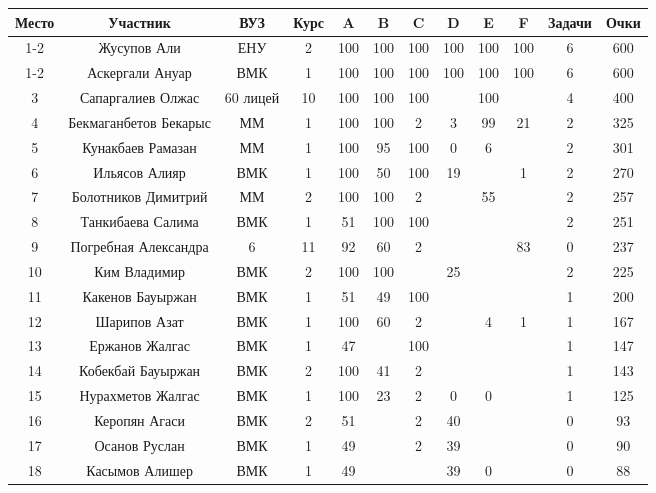 \begin{center}
\begin{longtable}{|c|c|c|c|*{6}{c|}c|c|}
\hline 
Место & 	Участник & 	ВУЗ & Курс & 	A & 	B & 	C & 	D & 	E & 	F & 	Задачи & 	Очки \\ 
 \hline
 \endhead
1-2 & 	Жусупов Али & 	ЕНУ & 2 &	100 & 	100 & 	100 & 	100 & 	100 & 	100 & 	6 & 	600 \\ 
 \hline
1-2 & 	Аскергали Ануар & 	ВМК & 1 & 	100 & 	100 & 	100 & 	100 & 	100 & 	100 & 	6 & 	600 \\ 
 \hline
3 & 	Сапаргалиев Олжас & 	60 лицей & 10 & 	100 & 	100 & 	100 & 	  & 	100 & 	  & 	4 & 	400 \\ 
 \hline
4 & 	Бекмаганбетов Бекарыс & 	ММ & 1 & 	100 & 	100 & 	2 & 	3 & 	99 & 	21 & 	2 & 	325 \\ 
 \hline
5 & 	Кунакбаев Рамазан & 	ММ & 1 & 	100 & 	95 & 	100 & 	0 & 	6 & 	  & 	2 & 	301 \\ 
 \hline
6 & 	Ильясов Алияр & 	ВМК & 1 & 	100 & 	50 & 	100 & 	19 & 	  & 	1 & 	2 & 	270 \\ 
 \hline
7 & 	Болотников Димитрий & 	ММ & 2 & 	100 & 	100 & 	2 & 	  & 	55 & 	  & 	2 & 	257 \\ 
 \hline
8 & 	Танкибаева Салима & 	ВМК & 1 & 	51 & 	100 & 	100 & 	  & 	  & 	  & 	2 & 	251 \\ 
 \hline
9 & 	Погребная Александра & 	6 & 11 & 	92 & 	60 & 	2 & 	  & 	  & 	83 & 	0 & 	237 \\ 
 \hline
10 & 	Ким Владимир & 	ВМК & 2 & 	100 & 	100 & 	  & 	25 & 	  & 	  & 	2 & 	225 \\ 
 \hline
11 & 	Какенов Бауыржан & 	ВМК & 1 & 	51 & 	49 & 	100 & 	  & 	  & 	  & 	1 & 	200 \\ 
 \hline
12 & 	Шарипов Азат & 	ВМК & 1 & 	100 & 	60 & 	2 & 	  & 	4 & 	1 & 	1 & 	167 \\ 
 \hline
13 & 	Ержанов Жалгас & 	ВМК & 1 & 	47 & 	  & 	100 & 	  & 	  & 	  & 	1 & 	147 \\ 
 \hline
14 & 	Кобекбай Бауыржан & 	ВМК & 2 & 	100 & 	41 & 	2 & 	  & 	  & 	  & 	1 & 	143 \\ 
 \hline
15 & 	Нурахметов Жалгас & 	ВМК & 1 & 	100 & 	23 & 	2 & 	0 & 	0 & 	  & 	1 & 	125 \\ 
 \hline
16 & 	Керопян Агаси & 	ВМК & 2 & 	51 & 	  & 	2 & 	40 & 	  & 	  & 	0 & 	93 \\ 
 \hline
17 & 	Осанов Руслан & 	ВМК & 1 & 	49 & 	  & 	2 & 	39 & 	  & 	  & 	0 & 	90 \\ 
 \hline
18 & 	Касымов Алишер & 	ВМК & 1 & 	49 & 	  & 	  & 	39 & 	0 & 	  & 	0 & 	88 \\ 

\end{longtable}
\end{center}
